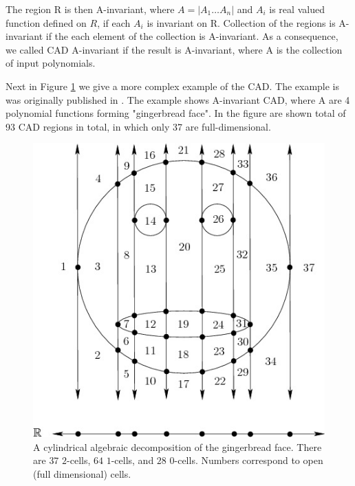 \documentclass[
  digital, %
  twoside, %
  table,   %
  nolof,     %
  nolot,     %
]{fithesis3}
\begin{document}
The region R is then A-invariant, where $A=|A_1\dots A_n|$ and $A_i$ is real valued function defined on $R$, if each $A_i$ is invariant on R.
Collection of the regions is A-invariant if the each element of the collection is A-invariant. As a consequence, we called CAD A-invariant if the result is A-invariant, where A is the collection of input polynomials.

Next in Figure \ref{fig:gingerbreadCAD} we give a more complex example of the CAD. The example is was originally published in . The example shows A-invariant CAD, where A are 4 polynomial functions forming "gingerbread face". In the figure are shown total of 93 CAD regions in total, in which only 37 are full-dimensional.

\begin{figure}
  \begin{center}
      \begin{minipage}{0.7\textwidth}
      \includegraphics[width=\textwidth]{fithesis/images/CADface.jpg} 
    \end{minipage}
  \end{center}
  \caption{ A cylindrical algebraic decomposition of the gingerbread face. There are $ 37$ $ 2$-cells, $ 64$ $ 1$-cells, and $ 28$ 0-cells. Numbers correspond to open (full dimensional) cells. \cite{LaValle:2006:PA:1213331}}
  \label{fig:gingerbreadCAD}
\end{figure}
\end{document}

